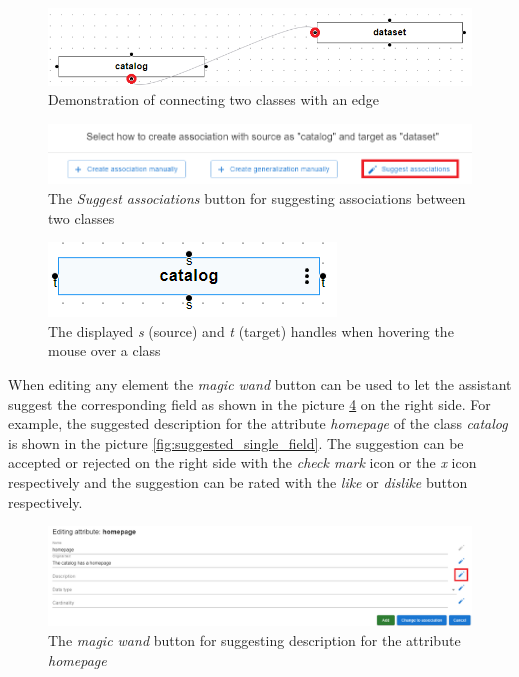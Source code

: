 \begin{figure}[!h]
    \includegraphics[scale=0.32]{../docs/images/frontend/edge-drag.png}
    \caption{\centering Demonstration of connecting two classes with an edge}
    \label{fig:edge_drag}
\end{figure}


\begin{figure}[!h]
    \includegraphics[scale=0.33]{../docs/images/frontend/suggest-associations-2.png}
    \caption{\centering The \textit{Suggest associations} button for suggesting associations between two classes}
    \label{fig:suggest_associations_2}
\end{figure}


\begin{figure}[!h]
    \includegraphics[scale=0.26]{../docs/images/frontend/handles.png}
    \caption{\centering The displayed \textit{s} (source) and \textit{t} (target) handles when hovering the mouse over a class}
    \label{fig:handles}
\end{figure}


When editing any element the \textit{magic wand} button can be used to let the assistant suggest the corresponding field as shown in the picture \ref{fig:suggest_single_field} on the right side. For example, the suggested description for the attribute \textit{homepage} of the class \textit{catalog} is shown in the picture \ref{fig:suggested_single_field}. The suggestion can be accepted or rejected on the right side with the \textit{check mark} icon or the \textit{x} icon respectively and the suggestion can be rated with the \textit{like} or \textit{dislike} button respectively.

\begin{figure}[!h]
    \includegraphics[scale=0.31]{../docs/images/frontend/suggest-single-field.png}
    \caption{\centering The \textit{magic wand} button for suggesting description for the attribute \textit{homepage}}
    \label{fig:suggest_single_field}
\end{figure}

